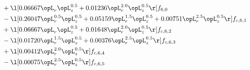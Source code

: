 \begin{alignat}{2}
& + \l[  0.06667 \opL_r \opL_z^{0.5} +  0.01236 \opL_r^{2.0} \opL_z^{0.5}  \r] f_{6,0} \nonumber \\ 
& - \l[  0.26047 \opL_r^{0.5} \opL_z^{0.5} +  0.05159 \opL_r^{1.5} \opL_z^{0.5} +  0.00751 \opL_r^{2.5} \opL_z^{0.5}  \r] f_{c,6,1} \nonumber \\ 
& + \l[  0.06667 \opL_r \opL_z^{0.5} +  0.01648 \opL_r^{2.0} \opL_z^{0.5}  \r] f_{c,6,2} \nonumber \\ 
& - \l[  0.01720 \opL_r^{1.5} \opL_z^{0.5} +  0.00376 \opL_r^{2.5} \opL_z^{0.5}  \r] f_{c,6,3} \nonumber \\ 
& + \l[  0.00412 \opL_r^{2.0} \opL_z^{0.5}  \r] f_{c,6,4} \nonumber \\ 
& - \l[  0.00075 \opL_r^{2.5} \opL_z^{0.5}  \r] f_{c,6,5} \nonumber \\ 
\end{alignat} 


